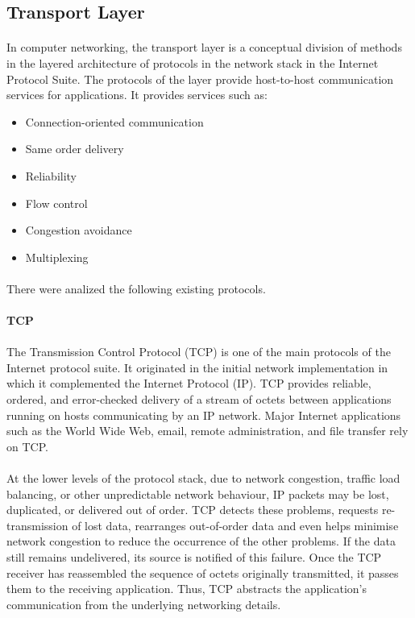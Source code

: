 \subsection{Transport Layer}
\paragraph{}
In computer networking, the transport layer is a conceptual division of methods in the layered architecture of protocols in the network stack in the Internet Protocol Suite.  The protocols of the layer provide host-to-host communication services for applications. It provides services such as:
\begin{itemize}
\item Connection-oriented communication
\item Same order delivery
\item Reliability
\item Flow control
\item Congestion avoidance
\item Multiplexing
\end{itemize}
\paragraph{}
There were analized the following existing protocols.

\paragraph{} \textbf{TCP}
\paragraph*{}
The Transmission Control Protocol (TCP) is one of the main protocols of the Internet protocol suite. It originated in the initial network implementation in which it complemented the Internet Protocol (IP). TCP provides reliable, ordered, and error-checked delivery of a stream of octets between applications running on hosts communicating by an IP network. Major Internet applications such as the World Wide Web, email, remote administration, and file transfer rely on TCP.
\paragraph{}
At the lower levels of the protocol stack, due to network congestion, traffic load balancing, or other unpredictable network behaviour, IP packets may be lost, duplicated, or delivered out of order. TCP detects these problems, requests re-transmission of lost data, rearranges out-of-order data and even helps minimise network congestion to reduce the occurrence of the other problems. If the data still remains undelivered, its source is notified of this failure. Once the TCP receiver has reassembled the sequence of octets originally transmitted, it passes them to the receiving application. Thus, TCP abstracts the application's communication from the underlying networking details.
